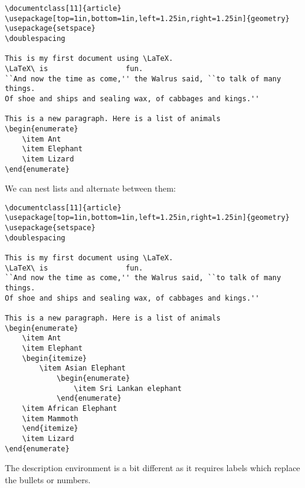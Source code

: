 \begin{lstlisting}
\documentclass[11]{article}
\usepackage[top=1in,bottom=1in,left=1.25in,right=1.25in]{geometry}
\usepackage{setspace}
\doublespacing

This is my first document using \LaTeX.
\LaTeX\ is                  fun.
``And now the time as come,'' the Walrus said, ``to talk of many things.
Of shoe and ships and sealing wax, of cabbages and kings.''

This is a new paragraph. Here is a list of animals
\begin{enumerate}
	\item Ant
	\item Elephant
	\item Lizard
\end{enumerate}

\end{lstlisting}

We can nest lists and alternate between them:

\begin{lstlisting}
\documentclass[11]{article}
\usepackage[top=1in,bottom=1in,left=1.25in,right=1.25in]{geometry}
\usepackage{setspace}
\doublespacing

This is my first document using \LaTeX.
\LaTeX\ is                  fun.
``And now the time as come,'' the Walrus said, ``to talk of many things.
Of shoe and ships and sealing wax, of cabbages and kings.''

This is a new paragraph. Here is a list of animals
\begin{enumerate}
	\item Ant
	\item Elephant
	\begin{itemize}
		\item Asian Elephant
			\begin{enumerate}
				\item Sri Lankan elephant
			\end{enumerate}
	\item African Elephant
	\item Mammoth
	\end{itemize}
	\item Lizard
\end{enumerate}

\end{lstlisting}

The description environment is a bit different as it requires labels which replace the bullets or numbers.

